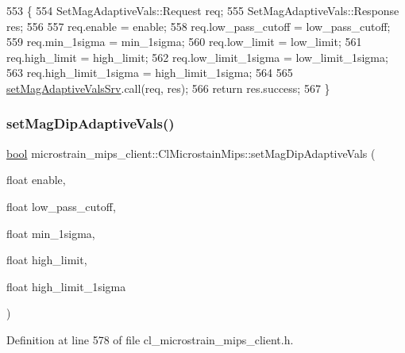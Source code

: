 \begin{DoxyCode}
553     \{
554         SetMagAdaptiveVals::Request req;
555         SetMagAdaptiveVals::Response res;
556 
557         req.enable = enable;
558         req.low\_pass\_cutoff = low\_pass\_cutoff;
559         req.min\_1sigma = min\_1sigma;
560         req.low\_limit = low\_limit;
561         req.high\_limit = high\_limit;
562         req.low\_limit\_1sigma = low\_limit\_1sigma;
563         req.high\_limit\_1sigma = high\_limit\_1sigma;
564 
565         \hyperlink{classmicrostrain__mips__client_1_1ClMicrostainMips_a912d08b51a2ca485661ad28423d25bb3}{setMagAdaptiveValsSrv}.call(req, res);
566         \textcolor{keywordflow}{return} res.success;
567     \}
\end{DoxyCode}
\mbox{\label{classmicrostrain__mips__client_1_1ClMicrostainMips_a53f4f322bacf7c4f492b908176b6efd3}} 
\subsubsection{\texorpdfstring{set\+Mag\+Dip\+Adaptive\+Vals()}{setMagDipAdaptiveVals()}}
{\footnotesize\ttfamily \hyperlink{classbool}{bool} microstrain\+\_\+mips\+\_\+client\+::\+Cl\+Microstain\+Mips\+::set\+Mag\+Dip\+Adaptive\+Vals (\begin{DoxyParamCaption}\item[{float}]{enable,  }\item[{float}]{low\+\_\+pass\+\_\+cutoff,  }\item[{float}]{min\+\_\+1sigma,  }\item[{float}]{high\+\_\+limit,  }\item[{float}]{high\+\_\+limit\+\_\+1sigma }\end{DoxyParamCaption})\hspace{0.3cm}{\ttfamily [inline]}}



Definition at line 578 of file cl\+\_\+microstrain\+\_\+mips\+\_\+client.\+h.


